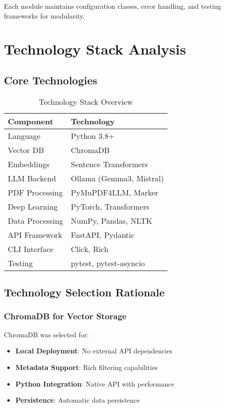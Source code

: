 \documentclass[10pt,a4paper,twocolumn]{article}
\begin{document}
Each module maintains configuration classes, error handling, and testing frameworks for modularity.

\section{Technology Stack Analysis}

\subsection{Core Technologies}

\begin{table}[H]
\centering
\small
\begin{tabular}{@{}p{2.5cm}p{4cm}@{}}
\toprule
\textbf{Component} & \textbf{Technology} \\
\midrule
Language & Python 3.8+ \\
Vector DB & ChromaDB \\
Embeddings & Sentence Transformers \\
LLM Backend & Ollama (Gemma3, Mistral) \\
PDF Processing & PyMuPDF4LLM, Marker \\
Deep Learning & PyTorch, Transformers \\
Data Processing & NumPy, Pandas, NLTK \\
API Framework & FastAPI, Pydantic \\
CLI Interface & Click, Rich \\
Testing & pytest, pytest-asyncio \\
\bottomrule
\end{tabular}
\caption{Technology Stack Overview}
\end{table}

\subsection{Technology Selection Rationale}

\subsubsection{ChromaDB for Vector Storage}
ChromaDB was selected for:
\begin{itemize}[leftmargin=1em]
    \item \textbf{Local Deployment}: No external API dependencies
    \item \textbf{Metadata Support}: Rich filtering capabilities
    \item \textbf{Python Integration}: Native API with performance
    \item \textbf{Persistence}: Automatic data persistence
\end{itemize}
\end{document}
